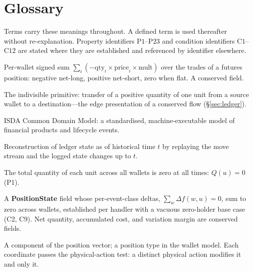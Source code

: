 \section{Glossary}
\label{sec:appE}
\label{app:glossary}

Terms carry these meanings throughout. A defined term is used thereafter without
re-explanation. Property identifiers $\mathrm{P}1$--$\mathrm{P}23$ and condition
identifiers $\mathrm{C}1$--$\mathrm{C}12$ are stated where they are established and
referenced by identifier elsewhere.

\begin{description}[style=nextline]

\item[Accumulated cost] Per-wallet signed sum $\sum_i(-\mathrm{qty}_i\times\mathrm{price}_i\times\mathrm{mult})$ over the trades of a futures position: negative net-long, positive net-short, zero when flat. A conserved field.

\item[Atomic move] The indivisible primitive: transfer of a positive quantity of one unit from a source wallet to a destination---the edge presentation of a conserved flow (\S\ref{sec:ledger}).

\item[CDM] ISDA Common Domain Model: a standardised, machine-executable model of financial products and lifecycle events.

\item[Clone\_at($t$)] Reconstruction of ledger state as of historical time $t$ by replaying the move stream and the logged state changes up to $t$.

\item[Conservation law] The total quantity of each unit across all wallets is zero at all times: $Q(u)=0$ (P1).

\item[Conserved field] A \textbf{PositionState} field whose per-event-class deltas, $\sum_w\Delta f(w,u)=0$, sum to zero across wallets, established per handler with a vacuous zero-holder base case (C2, C9). Net quantity, accumulated cost, and variation margin are conserved fields.

\item[Coordinate] A component of the position vector; a position type in the wallet model. Each coordinate passes the physical-action test: a distinct physical action modifies it and only it.


\end{description}
